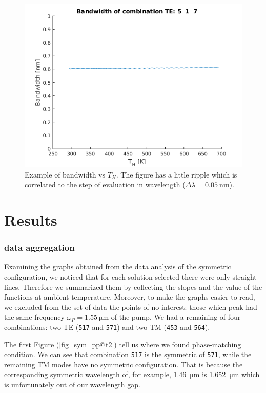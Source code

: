 \documentclass[12pt,a4paper,twoside]{article}
\begin{document}
\begin{figure}[!hb]
	\centering
	\includegraphics[width=.75\textwidth]{ex_bw.png}
	\caption{Example of bandwidth vs $T_H$. The figure has a little ripple which is correlated to the step of evaluation in wavelength ($\Delta \lambda = \SI{0.05}{\nm}$).}
	\label{fig_example_bandwidth}
\end{figure}

\clearpage
\section{Results}
\subsubsection{data aggregation}
Examining the graphs obtained from the data analysis of the symmetric configuration, we noticed that for each solution selected there were only straight lines.
Therefore we summarized them by collecting the slopes and the value of the functions at ambient temperature.
Moreover, to make the graphs easier to read, we excluded from the set of data the points of no interest: those which peak had the same frequency $\omega_P = \SI{1.55}{\um}$ of the pump.
We had a remaining of four combinations: two TE (\texttt{517} and \texttt{571}) and two TM (\texttt{453} and \texttt{564}).

The first Figure (\ref{fig_sym_pp@t2}) tell us where we found phase-matching condition.
We can see that combination \texttt{517} is the symmetric of \texttt{571}, while the remaining TM modes have no symmetric configuration.
That is because the corresponding symmetric wavelength of, for example, \SI{1.46}{\um} is \SI{1,652}{\um} which is unfortunately out of our wavelength gap.
\end{document}
